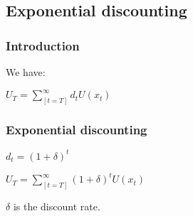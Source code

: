 
\subsection{Exponential discounting}

\subsubsection{Introduction}

We have:

\(U_T=\sum_[t=T]^{\infty }d_tU(x_t)\)

\subsubsection{Exponential discounting}

\(d_t=(1+\delta )^t\)

\(U_T=\sum_[t=T]^{\infty }(1+\delta )^tU(x_t)\)

\(\delta \) is the discount rate.

